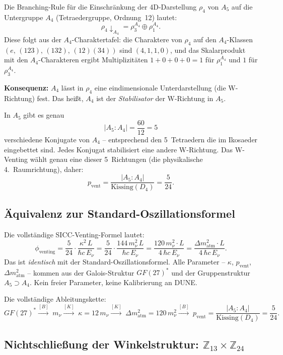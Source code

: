 Die Branching-Rule für die Einschränkung der 4D-Darstellung
$\rho_4$ von $A_5$ auf die Untergruppe $A_4$ (Tetraedergruppe,
Ordnung~12) lautet:
\[
\boxed{\rho_4\!\downarrow_{A_4}=\rho_3^{A_4}\oplus\rho_1^{A_4}.}
\]
Diese folgt aus der $A_4$-Charaktertafel: die Charaktere von
$\rho_4$ auf den $A_4$-Klassen $(e,\,(123),\,(132),\,(12)(34))$
sind $(4,1,1,0)$, und das Skalarprodukt mit den
$A_4$-Charakteren ergibt Multiplizitäten $1+0+0+0=1$ für
$\rho_1^{A_4}$ und $1$ für $\rho_3^{A_4}$.

\medskip
\textbf{Konsequenz:} $A_4$ lässt in $\rho_4$ eine
eindimensionale Unterdarstellung (die W-Richtung) fest.
Das heißt, $A_4$ ist der \emph{Stabilisator} der W-Richtung
in $A_5$.

In $A_5$ gibt es genau
\[
|A_5:A_4|=\frac{60}{12}=5
\]
verschiedene Konjugate von $A_4$ -- entsprechend den 5~Tetraedern
die im Ikosaeder eingebettet sind. Jedes Konjugat stabilisiert
eine andere W-Richtung. Das W-Venting wählt genau eine dieser
5~Richtungen (die physikalische 4.~Raumrichtung), daher:
\[
\boxed{p_\text{vent}=\frac{|A_5:A_4|}{\text{Kissing}(D_4)}
=\frac{5}{24}.}
\]

\subsection{Äquivalenz zur Standard-Oszillationsformel}

Die vollständige SICC-Venting-Formel lautet:
\[
\phi_\text{venting}
=\frac{5}{24}\cdot\frac{\kappa^2\,L}{\hbar c\,E_\nu}
=\frac{5}{24}\cdot\frac{144\,m_\nu^2\,L}{\hbar c\,E_\nu}
=\frac{120\,m_\nu^2\cdot L}{4\,\hbar c\,E_\nu}
=\frac{\Delta m^2_\text{atm}\cdot L}{4\,\hbar c\,E_\nu}.
\]
Das ist \emph{identisch} mit der Standard-Oszillationsformel.
Alle Parameter -- $\kappa$, $p_\text{vent}$, $\Delta m^2_\text{atm}$
-- kommen aus der Galois-Struktur $GF(27)^*$ und der
Gruppenstruktur $A_5\supset A_4$. Kein freier Parameter,
keine Kalibrierung an DUNE.

Die vollständige Ableitungskette:
\[
GF(27)^*
\xrightarrow{[B]}\;m_\nu
\xrightarrow{[K]}\;\kappa=12\,m_\nu
\xrightarrow{[K]}\;\Delta m^2_\text{atm}=120\,m_\nu^2
\xrightarrow{[B]}\;p_\text{vent}=\frac{|A_5:A_4|}{\text{Kissing}(D_4)}
=\frac{5}{24}.
\]

\subsection{Nichtschließung der Winkelstruktur: $\mathbb{Z}_{13}\times\mathbb{Z}_{24}$ \BM}

